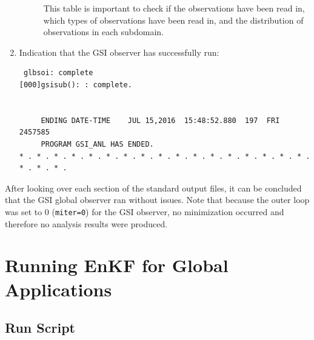 \begin{enumerate}
\begin{description}
This table is important to check if the observations have been read in, which types of observations have been read in, and the distribution of observations in each subdomain.\\
\end{description}

\item Indication that the GSI observer has successfully run:\\

\begin{footnotesize}
\begin{verbatim}
 glbsoi: complete
[000]gsisub(): : complete.


     ENDING DATE-TIME    JUL 15,2016  15:48:52.880  197  FRI   2457585
     PROGRAM GSI_ANL HAS ENDED.
* . * . * . * . * . * . * . * . * . * . * . * . * . * . * . * . * . * . * . * .
\end{verbatim}
\end{footnotesize}
\end{enumerate}

After looking over each section of the standard output files, it can be concluded that the GSI global observer ran without issues. Note that because the outer loop was set to 0 (\verb|miter=0|) for the GSI observer, no minimization occurred and therefore no analysis results were produced.

\section{Running EnKF for Global Applications}

\subsection{Run Script}

